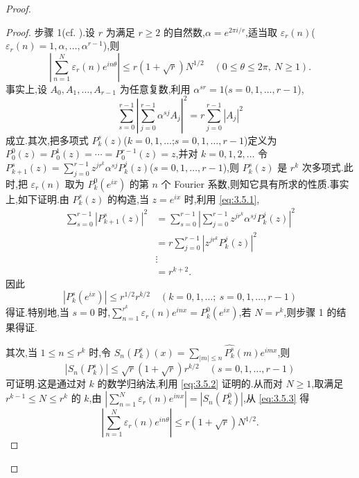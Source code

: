\begin{proof}
\begin{proof}
步骤 1(cf. \cite{ch3:41}).设 $r$ 为满足 $r \geq 2$ 的自然数,$\alpha = e^{2\pi i/r}$,适当取 $\varepsilon_{r}(n)$($\varepsilon_{r}(n) = 1, \alpha, \ldots, \alpha^{r-1}$),则
\begin{equation*}
\left|\sum_{n=1}^{N}\varepsilon_{r}(n)e^{in\theta}\right| \leq r(1+\sqrt{r})N^{1/2} \quad (0 \leq \theta \leq 2\pi,\ N \geq 1).
\end{equation*}
事实上,设 $A_{0}, A_{1}, \ldots, A_{r-1}$ 为任意复数,利用 $\alpha^{sr} = 1$($s = 0, 1, \ldots, r-1$),
\begin{equation}\tag{3.5.1}
\sum_{s=0}^{r-1}\left|\sum_{j=0}^{r-1}\alpha^{sj}A_{j}\right|^{2} = r\sum_{j=0}^{r-1}|A_{j}|^{2}
\label{eq:3.5.1}\end{equation}
成立.其次,把多项式 $P_{k}^{s}(z)$($k = 0, 1, \ldots$;$s = 0, 1, \ldots, r-1$)定义为 $P_{0}^{0}(z) = P_{0}^{1}(z) = \cdots = P_{0}^{r-1}(z) = z$,并对 $k = 0, 1, 2, \ldots$ 令 $P_{k+1}^{s}(z) = \sum_{j=0}^{r-1}z^{jr^{k}}\alpha^{sj}P_{k}^{j}(z)$($s = 0, 1, \ldots, r-1$),则 $P_{k}^{s}(z)$ 是 $r^{k}$ 次多项式.此时,把 $\varepsilon_{r}(n)$ 取为 $P_{k}^{0}(e^{ix})$ 的第 $n$ 个 Fourier 系数,则知它具有所求的性质.事实上,如下证明.由 $P_{k}^{s}(z)$ 的构造,当 $z = e^{ix}$ 时,利用 \eqref{eq:3.5.1},
\begin{align*}
\sum_{s=0}^{r-1}\left|P_{k+1}^{s}(z)\right|^{2} &= \sum_{s=0}^{r-1}\left|\sum_{j=0}^{r-1}z^{jr^{k}}\alpha^{sj}P_{k}^{j}(z)\right|^{2}\\
&= r\sum_{j=0}^{r-1}\left|z^{jr^{k}}P_{k}^{j}(z)\right|^{2}\\
&\vdots\\
&= r^{k+2}.
\end{align*}
因此
\begin{equation}\tag{3.5.2}
\left|P_{k}^{s}(e^{ix})\right| \leq r^{1/2}r^{k/2} \quad (k = 0, 1, \ldots;\ s = 0, 1, \ldots, r-1)
\label{eq:3.5.2}\end{equation}
得证.特别地,当 $s=0$ 时,$\sum_{n=1}^{r^{k}}\varepsilon_{r}(n)e^{inx}=P_{k}^{0}(e^{ix})$,若 $N=r^{k}$,则步骤 1 的结果得证.

其次,当 $1 \leq n \leq r^{k}$ 时,令 $S_{n}(P_{k}^{s})(x) = \sum_{|m| \leq n}\widehat{P_{k}^{s}}(m)e^{imx}$,则
\begin{equation}\tag{3.5.3}
\left|S_{n}(P_{k}^{s})\right| \leq \sqrt{r}(1+\sqrt{r})r^{k/2} \quad (s = 0, 1, \ldots, r-1)
\label{eq:3.5.3}\end{equation}
可证明.这是通过对 $k$ 的数学归纳法,利用 \eqref{eq:3.5.2} 证明的.从而对 $N \geq 1$,取满足 $r^{k-1} \leq N \leq r^{k}$ 的 $k$,由 $\left|\sum_{n=1}^{N}\varepsilon_{r}(n)e^{inx}\right| = \left|S_{n}(P_{k}^{0})\right|$,从 \eqref{eq:3.5.3} 得
\begin{equation*}
\left|\sum_{n=1}^{N}\varepsilon_{r}(n)e^{in\theta}\right| \leq r(1+\sqrt{r})N^{1/2}.
\end{equation*}


\end{proof}
\end{proof}
